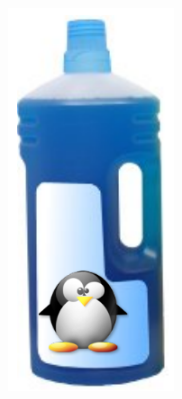 \begin{frame}
\begin{columns}
    \includegraphics[width=0.9\textwidth]{slides/sysdev-linux-intro-compilation/kernel-mrproper.png}
  \end{columns}
\end{frame}
